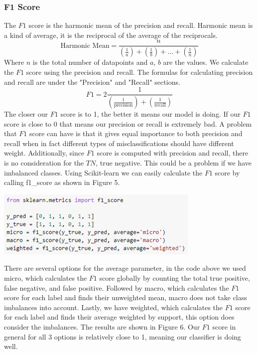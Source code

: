 \documentclass[a4paper,12pt]{report}
\begin{document}
\subsubsection{F1 Score}

The $F1$ score is the harmonic mean of the precision and recall. Harmonic mean is a kind of average, it is the reciprocal of the average of the reciprocals.
$$\text{Harmonic Mean}=\frac{n}{(\frac{1}{a})+(\frac{1}{b})+...+(\frac{1}{n})}$$
Where $n$ is the total number of datapoints and $a$, $b$ are the values.
We calculate the $F1$ score using the precision and recall. The formulas for calculating precision and recall are under the "Precision" and "Recall" sections. 
$$F1=2\frac{1}{(\frac{1}{\text{precision}})+(\frac{1}{\text{recall}})}$$
The closer our $F1$ score is to 1, the better it means our model is doing. If our $F1$ score is close to 0 that means our precision or recall is extremely bad. A problem that $F1$ score can have is that it gives equal importance to both precision and recall when in fact different types of misclassifications should have different weight. Additionally, since $F1$ score is computed with precision and recall, there is no consideration for the $TN$, true negative. This could be a problem if we have imbalanced classes. Using Scikit-learn we can easily calculate the $F1$ score by calling f1\_score as shown in Figure 5.

\begin{center}
    \captionsetup{type=figure}
    \includegraphics[width=.9\linewidth]{media/F1Code.png}
\end{center}

There are several options for the average parameter, in the code above we used micro, which calculates the $F1$ score globally by counting the total true positive, false negative, and false positive. Followed by macro, which calculates the $F1$ score for each label and finds their unweighted mean, macro does not take class imbalances into account. Lastly, we have weighted, which calculates the $F1$ score for each label and finds their average weighted by support, this option does consider the imbalances. The results are shown in Figure 6. Our $F1$ score in general for all 3 options is relatively close to 1, meaning our classifier is doing well.
\end{document}
